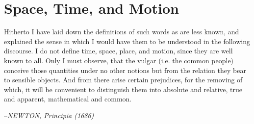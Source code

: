 \documentclass[12pt,a4paper]{book}
\begin{document}
\chapter{Space, Time, and Motion} \label{ch: 3-space-time-motion}
\epigraph
{
    Hitherto I have laid down the definitions of such words as are less known, and explained the sense in which I would have them to be understood in the following discourse. I do not define time, space, place, and motion, since they are well known to all. Only I must observe, that the vulgar (i.e. the common people) conceive those quantities under no other notions but from the relation they bear to sensible objects. And from there arise certain prejudices, for the removing of which, it will be convenient to distinguish them into absolute and relative, true and apparent, mathematical and common.
}
{
    --\textit{NEWTON, Principia (1686) \cite{principia}}
}
\end{document}
